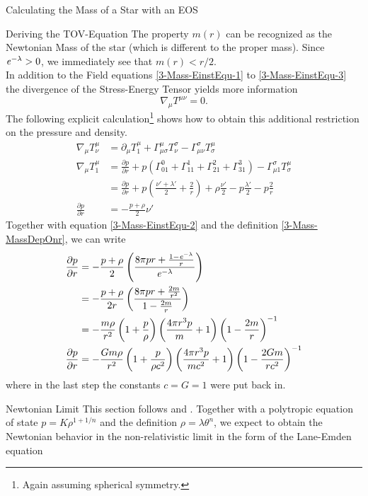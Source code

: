 \begin{section}{Calculating the Mass of a Star with an EOS}
\begin{subsection}{Deriving the TOV-Equation}
The property $m(r)$ can be recognized as the Newtonian Mass of the star (which is different to the proper mass). Since $\mathit{e}^{-\lambda}>0$, we immediately see that $m(r)<r/2$.\\
In addition to the Field equations \ref{3-Mass-EinstEqu-1} to \ref{3-Mass-EinstEqu-3} the divergence of the Stress-Energy Tensor yields more information
\begin{equation}
	\nabla_\mu T^{\mu\nu}=0.
\end{equation}
The following explicit calculation\footnote{Again assuming spherical symmetry.} shows how to obtain this additional restriction on the pressure and density.
\begin{align}
	\nabla_\mu T^\mu_\nu 	&= \partial_\mu T^\mu_1 + \Gamma^\mu_{\mu\sigma}T^\sigma_\nu-\Gamma^\sigma_{\mu\nu}T^\mu_\sigma\\
	\nabla_\mu T^\mu_1		&= \frac{\partial p}{\partial r} + p\left(\Gamma^0_{01}+\Gamma^1_{11}+\Gamma^2_{21}+\Gamma^3_{31} \right) - \Gamma^\sigma_{\mu 1}T^\mu_\sigma\\
							&= \frac{\partial p}{\partial r} + p\left(\frac{\nu'+\lambda'}{2} + \frac{2}{r}\right) + \rho\frac{\nu'}{2} - p\frac{\lambda'}{2} - p\frac{2}{r}\\
	\frac{\partial p}{\partial r} &= -\frac{p+\rho}{2}\nu'
\end{align}
Together with equation \ref{3-Mass-EinstEqu-2} and the definition \ref{3-Mass-MassDepOnr}, we can write
\begin{align}
	\frac{\partial p}{\partial r} 	&= -\frac{p+\rho}{2}\left(\frac{8\pi pr + \frac{1-\mathit{e}^{-\lambda}}{r}}{\mathit{e}^{-\lambda}} \right)\\
									&= -\frac{p+\rho}{2r}\left(\frac{8\pi pr+ \frac{2m}{r^2}}{1-\frac{2m}{r}} \right)\\
									&= -\frac{m\rho}{r^2}\left(1+\frac{p}{\rho}\right)\left(\frac{4\pi r^3p}{m}+1\right)\left(1-\frac{2m}{r}\right)^{-1}\\
	\frac{\partial p}{\partial r} 	&= -\frac{Gm\rho}{r^2}\left(1+\frac{p}{\rho c^2}\right)\left(\frac{4\pi r^3p}{mc^2}+1\right)\left(1-\frac{2Gm}{rc^2}\right)^{-1}
	\label{3-Mass-TOV-Eq}
\end{align}
where in the last step the constants $c=G=1$ were put back in. 
\end{subsection}
%
%
%
\begin{subsection}{Newtonian Limit}
\label{3-Mass-LEDerivation}
This section follows \cite{weissteinLaneEmdenDifferentialEquation} and \cite[89\psqq]{chandrasekharChandrasekharAnIntroductionStudy1958}. Together with a polytropic equation of state $p=K\rho^{1+1/n}$ and the definition $\rho=\lambda\theta^n$, we expect to obtain the Newtonian behavior in the non-relativistic limit in the form of the Lane-Emden equation

\end{subsection}
\end{section}
